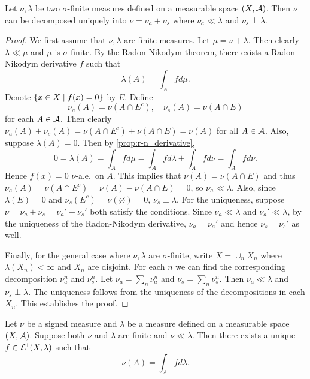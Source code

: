 \begin{theorem}
    Let $\nu,\lambda$ be two $\sigma$-finite measures defined on a measurable 
    space $(X,\mathcal{A})$. Then $\nu$ can be decomposed uniquely into 
    $\nu = \nu_a + \nu_s$ where $\nu_a\ll\lambda$ and $\nu_s\perp\lambda$.
\end{theorem}
\begin{proof}
    We first assume that $\nu,\lambda$ are finite measures. 
    Let $\mu = \nu + \lambda$. Then clearly $\lambda\ll\mu$ and $\mu$ is 
    $\sigma$-finite. By the Radon-Nikodym theorem, there exists a 
    Radon-Nikodym derivative $f$ such that 
    \begin{equation*}
        \lambda(A) = \int_A fd\mu.
    \end{equation*}
    Denote $\left\{ x\in X \;\middle\vert\; f(x) = 0 \right\}$ by $E$. Define 
    \begin{equation*}
        \nu_a(A) = \nu(A\cap E^c), \quad \nu_s(A) = \nu(A\cap E)
    \end{equation*}
    for each $A\in\mathcal{A}$. Then clearly $\nu_a(A) + \nu_s(A) 
    = \nu(A\cap E^c) + \nu(A\cap E) = \nu(A)$ for all $A\in\mathcal{A}$. 
    Also, suppose $\lambda(A) = 0$. Then by \cref{prop:r-n_derivative},
    \begin{equation*}
        0 = \lambda(A) = \int_A fd\mu = \int_A fd\lambda + \int_A fd\nu 
        = \int_A fd\nu.
    \end{equation*}
    Hence $f(x) = 0$ $\nu$-a.e.\ on $A$. This implies that $\nu(A) 
    = \nu(A\cap E)$ and thus $\nu_a(A) = \nu(A\cap E^c) = \nu(A) 
    - \nu(A\cap E) = 0$, so $\nu_a\ll\lambda$. Also, since $\lambda(E) 
    = 0$ and $\nu_s(E^c) = \nu(\varnothing) = 0$, $\nu_s\perp\lambda$. 
    For the uniqueness, suppose $\nu = \nu_a + \nu_s = \nu_a' + \nu_s'$ 
    both satisfy the conditions. Since $\nu_a\ll\lambda$ and 
    $\nu_a'\ll\lambda$, by the uniqueness of the Radon-Nikodym 
    derivative, $\nu_a = \nu_a'$ and hence $\nu_s = \nu_s'$ as well. 

    Finally, for the general case where $\nu,\lambda$ are $\sigma$-finite, 
    write $X = \cup_n X_n$ where $\lambda(X_n)<\infty$ and $X_n$ are 
    disjoint. For each $n$ we can find the corresponding decomposition 
    $\nu_a^n$ and $\nu_s^n$. Let $\nu_a = \sum_n \nu_a^n$ and $\nu_s = 
    \sum_n \nu_s^n$. Then $\nu_a\ll\lambda$ and $\nu_s\perp\lambda$. 
    The uniqueness follows from the uniqueness of the decompositions 
    in each $X_n$. This establishes the proof.
\end{proof}
\begin{corollary}
    Let $\nu$ be a signed measure and $\lambda$ be a measure defined on 
    a measurable space $(X,\mathcal{A})$. Suppose both $\nu$ and $\lambda$ are 
    finite and $\nu\ll\lambda$. Then there exists a unique 
    $f\in\mathcal{L}^1(X,\lambda)$ such that 
    \begin{equation*}
        \nu(A) = \int_A fd\lambda.
    \end{equation*}
\end{corollary}
